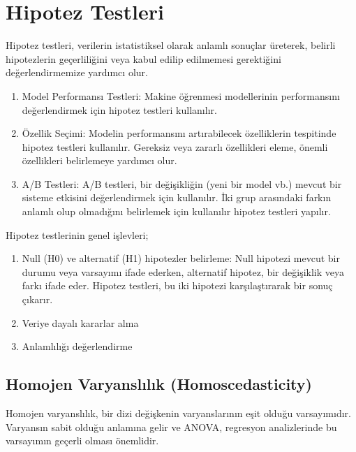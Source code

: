 \section{Hipotez Testleri}
Hipotez testleri, verilerin istatistiksel olarak anlamlı sonuçlar üreterek, belirli hipotezlerin geçerliliğini veya kabul edilip edilmemesi gerektiğini değerlendirmemize yardımcı olur.

\begin{enumerate}
    \item Model Performansı Testleri: Makine öğrenmesi modellerinin performansını değerlendirmek için hipotez testleri kullanılır.
    \item Özellik Seçimi: Modelin performansını artırabilecek özelliklerin tespitinde hipotez testleri kullanılır. Gereksiz veya zararlı özellikleri eleme, önemli özellikleri belirlemeye yardımcı olur.
    \item A/B Testleri: A/B testleri, bir değişikliğin (yeni bir model vb.) mevcut bir sisteme etkisini değerlendirmek için kullanılır. İki grup arasındaki farkın anlamlı olup olmadığını belirlemek için kullanılır hipotez testleri yapılır.
\end{enumerate}
Hipotez testlerinin genel işlevleri;
\begin{enumerate}
    \item Null (H0) ve alternatif (H1) hipotezler belirleme: Null hipotezi mevcut bir durumu veya varsayımı ifade ederken, alternatif hipotez, bir değişiklik veya farkı ifade eder. Hipotez testleri, bu iki hipotezi karşılaştırarak bir sonuç çıkarır.
    \item Veriye dayalı kararlar alma
    \item Anlamlılığı değerlendirme
\end{enumerate}

\subsection{Homojen Varyanslılık (Homoscedasticity)}
Homojen varyanslılık, bir dizi değişkenin varyanslarının eşit olduğu varsayımıdır. Varyansın sabit olduğu anlamına gelir ve ANOVA, regresyon analizlerinde bu varsayımın geçerli olması önemlidir. 


